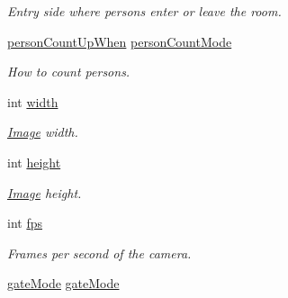 \begin{DoxyCompactItemize}
\begin{DoxyCompactList}\small\item\em Entry side where persons enter or leave the room. \end{DoxyCompactList}\item 
\mbox{\label{structdto_1_1_camera_aa0be7a62ca911724bc33576139856662}} 
\mbox{\hyperlink{structdto_1_1_camera_a737146d299fc52d1303ef07858ed2641}{person\+Count\+Up\+When}} \mbox{\hyperlink{structdto_1_1_camera_aa0be7a62ca911724bc33576139856662}{person\+Count\+Mode}}
\begin{DoxyCompactList}\small\item\em How to count persons. \end{DoxyCompactList}\item 
\mbox{\label{structdto_1_1_camera_ae0215effb4356e2600c91fbbafc4820c}} 
int \mbox{\hyperlink{structdto_1_1_camera_ae0215effb4356e2600c91fbbafc4820c}{width}}
\begin{DoxyCompactList}\small\item\em \mbox{\hyperlink{structdto_1_1_image}{Image}} width. \end{DoxyCompactList}\item 
\mbox{\label{structdto_1_1_camera_a9cf2ee87434453136d2ca9b12652c784}} 
int \mbox{\hyperlink{structdto_1_1_camera_a9cf2ee87434453136d2ca9b12652c784}{height}}
\begin{DoxyCompactList}\small\item\em \mbox{\hyperlink{structdto_1_1_image}{Image}} height. \end{DoxyCompactList}\item 
\mbox{\label{structdto_1_1_camera_ac9709776537adf87618a69b2eb153d3c}} 
int \mbox{\hyperlink{structdto_1_1_camera_ac9709776537adf87618a69b2eb153d3c}{fps}}
\begin{DoxyCompactList}\small\item\em Frames per second of the camera. \end{DoxyCompactList}\item 
\mbox{\label{structdto_1_1_camera_abe17f3f3330829e42b1f25d84cb2e341}} 
\mbox{\hyperlink{structdto_1_1_camera_aba1051d9f599fac2813a0a7bfa50729d}{gate\+Mode}} \mbox{\hyperlink{structdto_1_1_camera_abe17f3f3330829e42b1f25d84cb2e341}{gate\+Mode}}

\end{DoxyCompactItemize}

